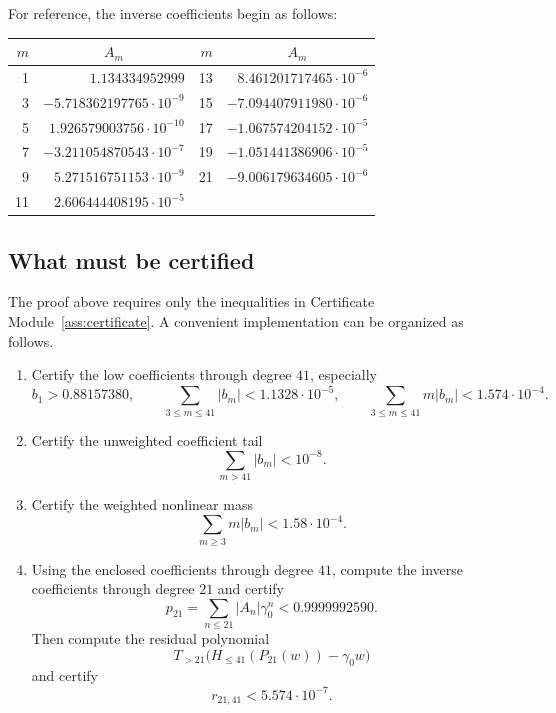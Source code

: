\documentclass[11pt]{article}
\newcommand{\1}{\mathbf 1}
\newcommand{\gammazero}{\gamma_0}
\theoremstyle{plain}
\theoremstyle{definition}
\theoremstyle{remark}
\begin{document}
For reference, the inverse coefficients begin as follows:
\begin{center}
\small
\begin{tabular}{r r@{\qquad}r r}
\toprule
\(m\) & \multicolumn{1}{c}{\(A_m\)} & \(m\) & \multicolumn{1}{c}{\(A_m\)}\\
\midrule
1  & \( 1.134334952999\) & 13 & \( 8.461201717465\cdot10^{-6}\)\\
3  & \(-5.718362197765\cdot10^{-9}\) & 15 & \(-7.094407911980\cdot10^{-6}\)\\
5  & \( 1.926579003756\cdot10^{-10}\) & 17 & \(-1.067574204152\cdot10^{-5}\)\\
7  & \(-3.211054870543\cdot10^{-7}\) & 19 & \(-1.051441386906\cdot10^{-5}\)\\
9  & \( 5.271516751153\cdot10^{-9}\) & 21 & \(-9.006179634605\cdot10^{-6}\)\\
11 & \( 2.606444408195\cdot10^{-5}\) & & \\
\bottomrule
\end{tabular}
\end{center}


\subsection{What must be certified}

The proof above requires only the inequalities in Certificate Module~\ref{ass:certificate}.  A convenient implementation can be organized as follows.

\begin{enumerate}[label=\textup{C\arabic*.}, leftmargin=2.7em]
\item Certify the low coefficients through degree \(41\), especially
\[
  b_1>0.88157380,
  \qquad
  \sum_{3\le m\le41}|b_m|<1.1328\cdot10^{-5},
  \qquad
  \sum_{3\le m\le41}m|b_m|<1.574\cdot10^{-4}.
\]

\item Certify the unweighted coefficient tail
\[
  \sum_{m>41}|b_m|<10^{-8}.
\]

\item Certify the weighted nonlinear mass
\[
  \sum_{m\ge3}m|b_m|<1.58\cdot10^{-4}.
\]

\item Using the enclosed coefficients through degree \(41\), compute the inverse coefficients through degree \(21\) and certify
\[
  p_{21}=\sum_{n\le21}|A_n|\gammazero^n<0.9999992590.
\]
Then compute the residual polynomial
\[
  T_{>21}\bigl(H_{\le41}(P_{21}(w))-\gammazero w\bigr)
\]
and certify
\[
  r_{21,41}<5.574\cdot10^{-7}.
\]
\end{enumerate}
\end{document}
